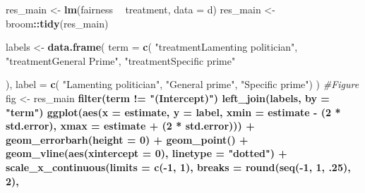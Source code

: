 \documentclass[]{book}
\newenvironment{Shaded}{\begin{snugshade}}{\end{snugshade}}
\newcommand{\KeywordTok}[1]{\textcolor[rgb]{0.13,0.29,0.53}{\textbf{#1}}}
\newcommand{\DataTypeTok}[1]{\textcolor[rgb]{0.13,0.29,0.53}{#1}}
\newcommand{\DecValTok}[1]{\textcolor[rgb]{0.00,0.00,0.81}{#1}}
\newcommand{\StringTok}[1]{\textcolor[rgb]{0.31,0.60,0.02}{#1}}
\newcommand{\CommentTok}[1]{\textcolor[rgb]{0.56,0.35,0.01}{\textit{#1}}}
\newcommand{\OperatorTok}[1]{\textcolor[rgb]{0.81,0.36,0.00}{\textbf{#1}}}
\newcommand{\NormalTok}[1]{#1}
\begin{document}
\begin{Shaded}
\begin{Highlighting}[]
\NormalTok{res_main <-}\StringTok{  }\KeywordTok{lm}\NormalTok{(fairness }\OperatorTok{~}\StringTok{ }\NormalTok{treatment, }\DataTypeTok{data =}\NormalTok{ d) }
\NormalTok{res_main <-}\StringTok{ }\NormalTok{broom}\OperatorTok{::}\KeywordTok{tidy}\NormalTok{(res_main)}

\NormalTok{labels <-}\StringTok{ }\KeywordTok{data.frame}\NormalTok{(}
  \DataTypeTok{term =} \KeywordTok{c}\NormalTok{(}
    \StringTok{"treatmentLamenting politician"}\NormalTok{,}
    \StringTok{"treatmentGeneral Prime"}\NormalTok{,}
    \StringTok{"treatmentSpecific prime"}
    
\NormalTok{  ),}
  \DataTypeTok{label =} \KeywordTok{c}\NormalTok{( }\StringTok{"Lamenting politician"}\NormalTok{,}
             \StringTok{"General prime"}\NormalTok{,}
             \StringTok{"Specific prime"}\NormalTok{)}
\NormalTok{)}
\CommentTok{#Figure}
\NormalTok{fig <-}\StringTok{   }\NormalTok{res_main }\OperatorTok{%>%}
\StringTok{  }\KeywordTok{filter}\NormalTok{(term }\OperatorTok{!=}\StringTok{ "(Intercept)"}\NormalTok{) }\OperatorTok{%>%}\StringTok{ }
\StringTok{  }\KeywordTok{left_join}\NormalTok{(labels, }\DataTypeTok{by =} \StringTok{"term"}\NormalTok{) }\OperatorTok{%>%}\StringTok{ }
\StringTok{  }
\StringTok{  }\KeywordTok{ggplot}\NormalTok{(}\KeywordTok{aes}\NormalTok{(}\DataTypeTok{x =}\NormalTok{ estimate, }\DataTypeTok{y =}\NormalTok{ label,}
             \DataTypeTok{xmin =}\NormalTok{ estimate }\OperatorTok{-}\StringTok{ }\NormalTok{(}\DecValTok{2} \OperatorTok{*}\StringTok{ }\NormalTok{std.error),}
             \DataTypeTok{xmax =}\NormalTok{ estimate }\OperatorTok{+}\StringTok{ }\NormalTok{(}\DecValTok{2} \OperatorTok{*}\StringTok{ }\NormalTok{std.error))) }\OperatorTok{+}
\StringTok{   }\KeywordTok{geom_errorbarh}\NormalTok{(}\DataTypeTok{height =} \DecValTok{0}\NormalTok{) }\OperatorTok{+}
\StringTok{  }\KeywordTok{geom_point}\NormalTok{() }\OperatorTok{+}
\StringTok{  }\KeywordTok{geom_vline}\NormalTok{(}\KeywordTok{aes}\NormalTok{(}\DataTypeTok{xintercept =} \DecValTok{0}\NormalTok{), }\DataTypeTok{linetype =} \StringTok{"dotted"}\NormalTok{) }\OperatorTok{+}
\StringTok{  }\KeywordTok{scale_x_continuous}\NormalTok{(}\DataTypeTok{limits =} \KeywordTok{c}\NormalTok{(}\OperatorTok{-}\DecValTok{1}\NormalTok{, }\DecValTok{1}\NormalTok{),}
                     \DataTypeTok{breaks =} \KeywordTok{round}\NormalTok{(}\KeywordTok{seq}\NormalTok{(}\OperatorTok{-}\DecValTok{1}\NormalTok{, }\DecValTok{1}\NormalTok{, .}\DecValTok{25}\NormalTok{), }\DecValTok{2}\NormalTok{),}
}}}
\end{Highlighting}
\end{Shaded}
\end{document}
